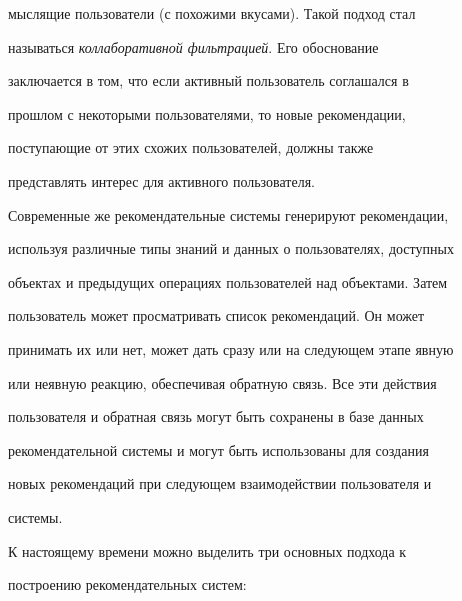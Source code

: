 мыслящие пользователи (с похожими вкусами). Такой подход стал


называться {\it коллаборативной фильтрацией}. Его обоснование


заключается в том, что если активный пользователь соглашался в


прошлом с некоторыми пользователями, то новые рекомендации,


поступающие от этих схожих пользователей, должны также


представлять интерес для активного пользователя.





Современные же рекомендательные системы генерируют рекомендации,


используя различные типы знаний и данных о пользователях, доступных


объектах и предыдущих операциях пользователей над объектами. Затем


пользователь может просматривать список рекомендаций. Он может


принимать их или нет, может дать сразу или на следующем этапе явную


или неявную реакцию, обеспечивая обратную связь. Все эти действия


пользователя и обратная связь могут быть сохранены в базе данных


рекомендательной системы и могут быть использованы для создания


новых рекомендаций при следующем взаимодействии пользователя и


системы.





К настоящему времени можно выделить три основных подхода к


построению рекомендательных систем:


